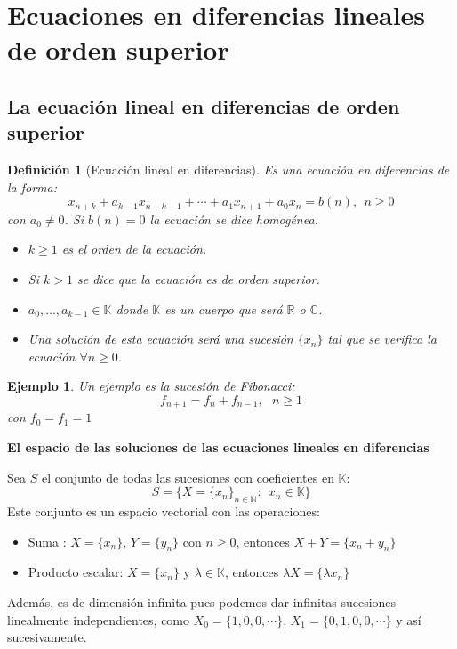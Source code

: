 \documentclass[11pt, a4paper]{article}
\newif\IfInSansMode
\numberwithin{equation}{section}
\newcommand{\R}{\mathbb{R}}
\theoremstyle{theorem-style}
\theoremstyle{definition-style}
\newtheorem{ndef}{Definición}[section]
\theoremstyle{remark-style}
\theoremstyle{example-style}
\newtheorem{ejemplo}{Ejemplo}[section]
\begin{document}
\section{Ecuaciones en diferencias lineales de orden superior}
\subsection[E.D. orden superior]{La ecuación lineal en diferencias de orden superior}
\begin{ndef}[Ecuación lineal en diferencias]
  Es una ecuación en diferencias de la forma:
  \[
    x_{n+k}+ a_{k-1}x_{n+k-1}+ \cdots + a_1 x_{n+1} + a_0 x_n = b(n), \ \ n \geq
    0
  \]
  con $a_0 \ne 0$. Si $b(n)= 0$ la ecuación se dice homogénea.
	
  \begin{itemize}
  \item $k \geq 1 $ es el orden de la ecuación.
  \item Si $k > 1$ se dice que la ecuación es de orden superior.
  \item $a_0,\dots,a_{k-1} \in \mathbb K $ donde $\mathbb K $ es un cuerpo que
    será $\R $ o $\mathbb C$.
  \item Una solución de esta ecuación será una sucesión $\{x_n\}$ tal que se
    verifica la ecuación $\forall n \geq 0$.
  \end{itemize}
\end{ndef}
\begin{ejemplo}
  Un ejemplo es la sucesión de Fibonacci:
  \[
    f_{n+1}= f_n+ f_{n-1}, \ \ \ n \geq 1
  \]
  con $f_0 = f_1 = 1$
\end{ejemplo}

\textbf{El espacio de las soluciones de las ecuaciones lineales en diferencias}

Sea $S$ el conjunto de todas las sucesiones con coeficientes en $\mathbb K$:
\[
  S= \{X=\{x_n\}_{n\in \mathbb N}: \ \ x_n \in \mathbb K\}
\]
Este conjunto es un espacio vectorial con las operaciones:
\begin{itemize}
\item Suma : $X= \{x_n\}$, $Y = \{y_n\}$ con $n\geq 0$, entonces
  $X+Y=\{x_n+y_n\}$
\item Producto escalar: $X= \{x_n\}$ y $\lambda \in \mathbb K$, entonces
  $\lambda X= \{\lambda x_n\}$
\end{itemize}
Además, es de dimensión infinita pues podemos dar infinitas sucesiones
linealmente independientes, como $X_0 = \{1, 0, 0, \cdots\}$,
$X_1=\{0,1,0,0,\cdots\}$ y así sucesivamente.
\end{document}
